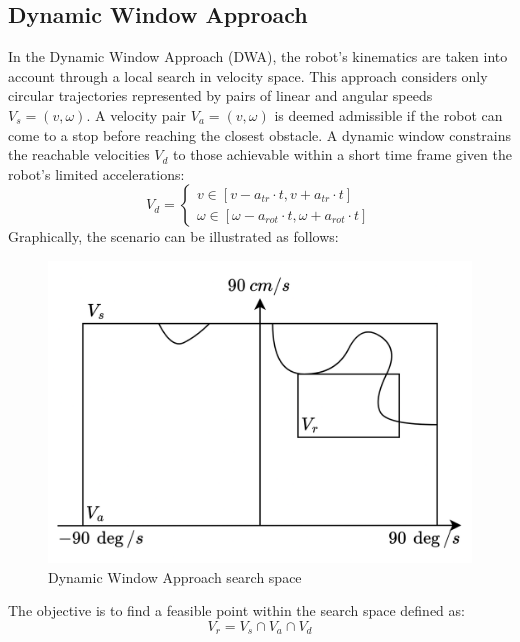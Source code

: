 \subsection{Dynamic Window Approach}
In the Dynamic Window Approach (DWA), the robot's kinematics are taken into account through a local search in velocity space.
This approach considers only circular trajectories represented by pairs of linear and angular speeds $V_s=(v,\omega)$. 
A velocity pair $V_a=(v,\omega)$ is deemed admissible if the robot can come to a stop before reaching the closest obstacle.
A dynamic window constrains the reachable velocities $V_d$ to those achievable within a short time frame given the robot's limited accelerations:
\[V_d=\begin{cases}
    v \in \left[v-a_{tr}\cdot t,v+a_{tr}\cdot t \right] \\
    \omega \in \left[\omega-a_{rot}\cdot t,\omega+a_{rot}\cdot t \right]
\end{cases}\]
Graphically, the scenario can be illustrated as follows:
\begin{figure}[H]
    \centering
    \includegraphics[width=0.75\linewidth]{images/dwa.png}
    \caption{Dynamic Window Approach search space}
\end{figure}
The objective is to find a feasible point within the search space defined as:
\[V_r =V_s \cap V_a \cap V_d\]

